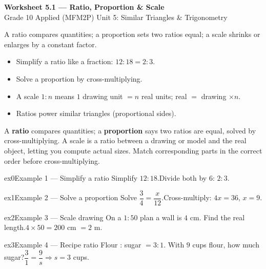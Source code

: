 \documentclass[11pt]{article}
\begin{document}
\begin{center}
{\LARGE\bfseries\color{titleblue}Worksheet 5.1 --- Ratio, Proportion \& Scale}\\[2pt]
{\small Grade 10 Applied (MFM2P) \textperiodcentered{} Unit 5: Similar Triangles \& Trigonometry}
\end{center}

\begin{ideabox}
A ratio compares quantities; a proportion sets two ratios equal; a scale shrinks or enlarges by a constant factor.
\begin{itemize}[leftmargin=*,itemsep=2pt]
  \item Simplify a ratio like a fraction: $12:18=2:3$.
  \item Solve a proportion by cross-multiplying.
  \item A scale $1:n$ means $1$ drawing unit $=n$ real units; real $=$ drawing $\times n$.
  \item Ratios power similar triangles (proportional sides).
\end{itemize}
\end{ideabox}

\begin{learnbox}
A \textbf{ratio} compares quantities; a \textbf{proportion} says two ratios are equal, solved by cross-multiplying.
A scale is a ratio between a drawing or model and the real object, letting you compute actual sizes.
Match corresponding parts in the correct order before cross-multiplying.
\end{learnbox}


\begin{example}{ex0}{Example 1 --- Simplify a ratio}
Simplify $12:18$.\soln Divide both by $6$: $2:3$.
\end{example}

\begin{example}{ex1}{Example 2 --- Solve a proportion}
Solve $\dfrac34=\dfrac{x}{12}$.\soln Cross-multiply: $4x=36$, $x=9$.
\end{example}

\begin{example}{ex2}{Example 3 --- Scale drawing}
On a $1:50$ plan a wall is $4$ cm. Find the real length.\soln $4\times50=200$ cm $=2$ m.
\end{example}

\begin{example}{ex3}{Example 4 --- Recipe ratio}
Flour : sugar $=3:1$. With $9$ cups flour, how much sugar?\soln $\dfrac31=\dfrac{9}{s}\Rightarrow s=3$ cups.
\end{example}
\end{document}
